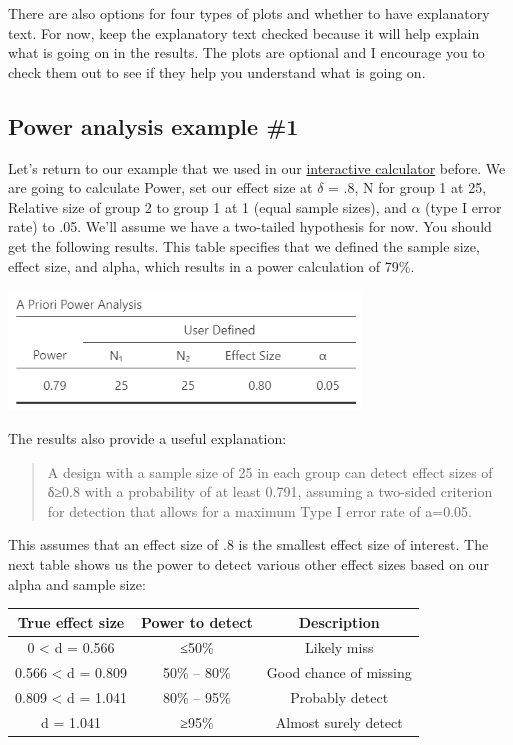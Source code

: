 \documentclass[
]{book}
\begin{document}
There are also options for four types of plots and whether to have explanatory text. For now, keep the explanatory text checked because it will help explain what is going on in the results. The plots are optional and I encourage you to check them out to see if they help you understand what is going on.

\hypertarget{power-analysis-example-1}{%
\subsection{Power analysis example \#1}\label{power-analysis-example-1}}

Let's return to our example that we used in our \href{https://rpsychologist.com/d3/pdist/}{interactive calculator} before. We are going to calculate Power, set our effect size at \(\delta\) = .8, N for group 1 at 25, Relative size of group 2 to group 1 at 1 (equal sample sizes), and \(\alpha\) (type I error rate) to .05. We'll assume we have a two-tailed hypothesis for now. You should get the following results. This table specifies that we defined the sample size, effect size, and alpha, which results in a power calculation of 79\%.

\includegraphics[width=3.67708in,height=\textheight]{images/05-bean/power-table.png}

The results also provide a useful explanation:

\begin{quote}
A design with a sample size of 25 in each group can detect effect sizes of δ≥0.8 with a probability of at least 0.791, assuming a two-sided criterion for detection that allows for a maximum Type I error rate of a=0.05.
\end{quote}

This assumes that an effect size of .8 is the smallest effect size of interest. The next table shows us the power to detect various other effect sizes based on our alpha and sample size:

\begin{longtable}[]{@{}ccc@{}}
\toprule
True effect size & Power to detect & Description \\
\midrule
\endhead
0 \textless{} d = 0.566 & ≤50\% & Likely miss \\
0.566 \textless{} d = 0.809 & 50\% -- 80\% & Good chance of missing \\
0.809 \textless{} d = 1.041 & 80\% -- 95\% & Probably detect \\
d = 1.041 & ≥95\% & Almost surely detect \\
\bottomrule
\end{longtable}
\end{document}
